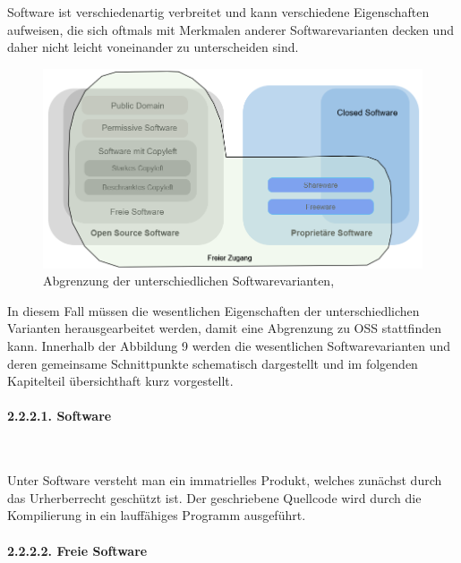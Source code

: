 Software ist verschiedenartig verbreitet und kann verschiedene Eigenschaften aufweisen, die sich oftmals mit Merkmalen anderer Softwarevarianten decken und daher nicht leicht voneinander zu unterscheiden sind. \cite[S. 3]{wichmann_linux-_2005}

\begin{figure}[h]
    \centering
    \includegraphics[scale=0.6]{Bilder/AbgrenzungSWvarianten.png}
    \caption{Abgrenzung der unterschiedlichen Softwarevarianten, \cite[S. 7]{wichmann_linux-_2005}}
\end{figure}

In diesem Fall müssen die wesentlichen Eigenschaften der unterschiedlichen Varianten herausgearbeitet werden, damit eine Abgrenzung zu OSS stattfinden kann. Innerhalb der Abbildung 9 werden die wesentlichen Softwarevarianten und deren gemeinsame Schnittpunkte schematisch dargestellt und im folgenden Kapitelteil übersichthaft kurz vorgestellt. 

\paragraph{2.2.2.1. Software} $~$

Unter Software versteht man ein immatrielles Produkt, welches zunächst durch das Urherberrecht geschützt ist. \cite[S. 24]{groll_1x1_2021} Der geschriebene Quellcode wird durch die Kompilierung in ein lauffähiges Programm ausgeführt.

\paragraph{2.2.2.2. Freie Software}$~$

